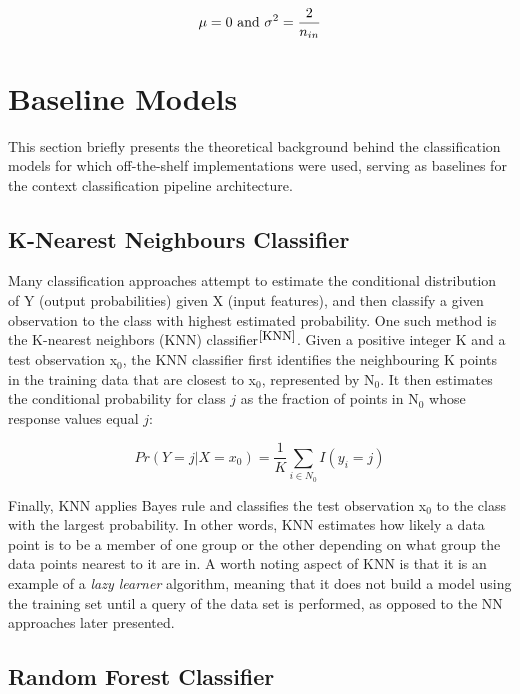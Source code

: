 \begin{equation}
  \centering
  \mu = 0 \ \text{and} \ \sigma^2 = \frac{2}{n_{in}}
\end{equation}

\section{Baseline Models}

This section briefly presents the theoretical background behind the classification models for which off-the-shelf implementations were used, serving as baselines for the context classification pipeline architecture. 

\subsection{K-Nearest Neighbours Classifier}
Many classification approaches attempt to estimate the conditional distribution of Y (output probabilities) given X (input features), and then classify a given observation to the class with highest estimated probability. One such method is the K-nearest neighbors (KNN) classifier$^{\small \cite{KNN}}$. Given a positive integer K and a test observation x$_0$, the KNN classifier first identifies the neighbouring K points in the training data that are closest to x$_0$, represented by N$_0$. It then estimates the conditional probability for class $j$ as the fraction of points in N$_0$ whose response values equal $j$:

\begin{equation}
    Pr(Y = j|X = x_0) = \frac{1}{K} \sum_{i \in N_0} I(y_i = j)
\end{equation}

Finally, KNN applies Bayes rule and classifies the test observation x$_0$ to
the class with the largest probability. In other words, KNN estimates how likely a data point is to be a member of one group or the other depending on what group the data points nearest to it are in. A worth noting aspect of KNN is that it is an example of a \textit{lazy learner} algorithm, meaning that it does not build a model using the training set until a query of the data set is performed, as opposed to the NN approaches later presented. 




\subsection{Random Forest Classifier}

